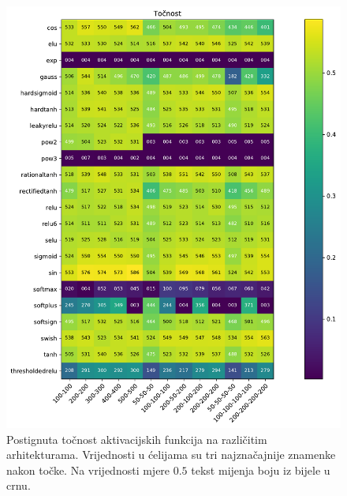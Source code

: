 \documentclass[times, utf8, numeric, diplomski]{fer}
\begin{document}
\begin{figure}[ht]
\includegraphics[width=\textwidth]{greedy_256_acc.pdf}
\centering
\caption{Postignuta točnost aktivacijskih funkcija na različitim arhitekturama. Vrijednosti u ćelijama su tri najznačajnije znamenke nakon točke. Na vrijednosti mjere $0.5$ tekst mijenja boju iz bijele u crnu.}
\label{fig:greedy_256_acc}
\end{figure}
\end{document}
